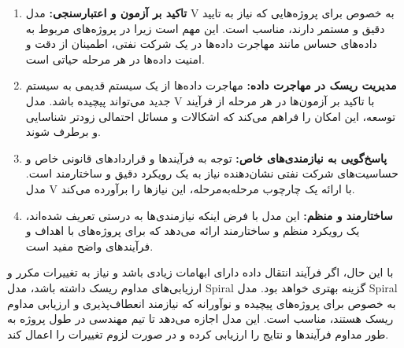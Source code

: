 \begin{itemize}

	\begin{enumerate}
		\item \textbf{تاکید بر آزمون و اعتبارسنجی:}
	مدل V به خصوص برای پروژه‌هایی که نیاز به تایید دقیق و مستمر دارند، مناسب است. این مهم است زیرا در پروژه‌های مربوط به داده‌های حساس مانند مهاجرت داده‌ها در یک شرکت نفتی، اطمینان از دقت و امنیت داده‌ها در هر مرحله حیاتی است.
	
		\item \textbf{مدیریت ریسک در مهاجرت داده:}
	 مهاجرت داده‌ها از یک سیستم قدیمی به سیستم جدید می‌تواند پیچیده باشد. مدل V با تاکید بر آزمون‌ها در هر مرحله از فرآیند توسعه، این امکان را فراهم می‌کند که اشکالات و مسائل احتمالی زودتر شناسایی و برطرف شوند.
	 
		\item \textbf{پاسخ‌گویی به نیازمندی‌های خاص:}
	توجه به فرآیندها و قراردادهای قانونی خاص و حساسیت‌های شرکت نفتی نشان‌دهنده نیاز به یک رویکرد دقیق و ساختارمند است. مدل V با ارائه یک چارچوب مرحله‌به‌مرحله، این نیازها را برآورده می‌کند.
		\item \textbf{ساختارمند و منظم:} این مدل با فرض اینکه نیازمندی‌ها به درستی تعریف شده‌اند، یک رویکرد منظم و ساختارمند ارائه می‌دهد که برای پروژه‌های با اهداف و فرآیندهای واضح مفید است.
	\end{enumerate}
	
	با این حال، اگر فرآیند انتقال داده دارای ابهامات زیادی باشد و نیاز به تغییرات مکرر و ارزیابی‌های مداوم ریسک داشته باشد، مدل Spiral گزینه بهتری خواهد بود. مدل Spiral به خصوص برای پروژه‌های پیچیده و نوآورانه که نیازمند انعطاف‌پذیری و ارزیابی مداوم ریسک هستند، مناسب است. این مدل اجازه می‌دهد تا تیم مهندسی در طول پروژه به طور مداوم فرآیندها و نتایج را ارزیابی کرده و در صورت لزوم تغییرات را اعمال کند.
	
\end{itemize}

